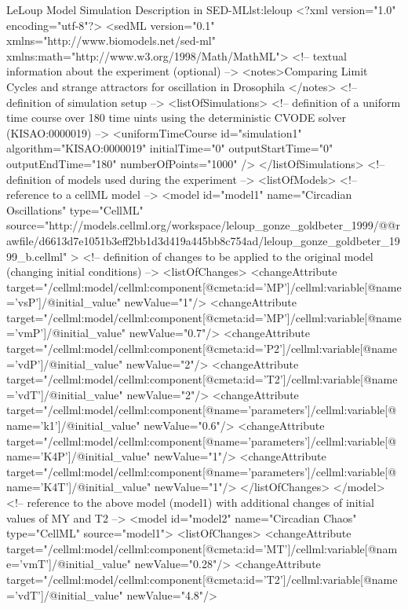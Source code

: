 \footnotesize
\begin{myXmlLst}{LeLoup Model Simulation Description in SED-ML}{lst:leloup}
<?xml version="1.0" encoding="utf-8"?>
<sedML version="0.1" xmlns="http://www.biomodels.net/sed-ml" xmlns:math="http://www.w3.org/1998/Math/MathML">
 <!-- textual information about the experiment (optional) -->
 <notes>Comparing Limit Cycles and strange attractors for oscillation in Drosophila
 </notes> 
 <!-- definition of simulation setup -->
 <listOfSimulations>
  <!-- definition of a uniform time course over 180 time uints using the deterministic CVODE solver (KISAO:0000019) -->
  <uniformTimeCourse id="simulation1" algorithm="KISAO:0000019" initialTime="0" outputStartTime="0" outputEndTime="180" numberOfPoints="1000" />
 </listOfSimulations>
 <!-- definition of models used during the experiment -->
 <listOfModels>
  <!-- reference to a cellML model -->
  <model id="model1" name="Circadian Oscillations" type="CellML" 
   source="http://models.cellml.org/workspace/leloup_gonze_goldbeter_1999/@@rawfile/d6613d7e1051b3eff2bb1d3d419a445bb8c754ad/leloup_gonze_goldbeter_1999_b.cellml" >
   <!-- definition of changes to be applied to the original model (changing initial conditions) -->
   <listOfChanges>
    <changeAttribute target="/cellml:model/cellml:component[@cmeta:id='MP']/cellml:variable[@name='vsP']/@initial_value" newValue="1"/>
    <changeAttribute target="/cellml:model/cellml:component[@cmeta:id='MP']/cellml:variable[@name='vmP']/@initial_value" newValue="0.7"/>
    <changeAttribute target="/cellml:model/cellml:component[@cmeta:id='P2']/cellml:variable[@name='vdP']/@initial_value" newValue="2"/>
    <changeAttribute target="/cellml:model/cellml:component[@cmeta:id='T2']/cellml:variable[@name='vdT']/@initial_value" newValue="2"/>  
    <changeAttribute target="/cellml:model/cellml:component[@name='parameters']/cellml:variable[@name='k1']/@initial_value" newValue="0.6"/>
    <changeAttribute target="/cellml:model/cellml:component[@name='parameters']/cellml:variable[@name='K4P']/@initial_value" newValue="1"/>
    <changeAttribute target="/cellml:model/cellml:component[@name='parameters']/cellml:variable[@name='K4T']/@initial_value" newValue="1"/>
   </listOfChanges>
  </model>
  <!-- reference to the above model (model1) with additional changes of initial values of MY and T2 -->
  <model id="model2" name="Circadian Chaos" type="CellML" source="model1">
   <listOfChanges>
    <changeAttribute target="/cellml:model/cellml:component[@cmeta:id='MT']/cellml:variable[@name='vmT']/@initial_value" newValue="0.28"/>
    <changeAttribute target="/cellml:model/cellml:component[@cmeta:id='T2']/cellml:variable[@name='vdT']/@initial_value" newValue="4.8"/>        

\end{myXmlLst}
